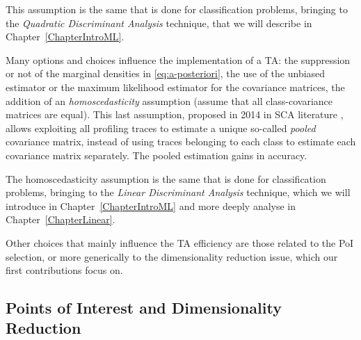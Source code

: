\begin{remark}This assumption is the same that is done for classification problems, bringing to the \emph{Quadratic Discriminant Analysis} technique, that we will describe in Chapter~\ref{ChapterIntroML}. 
\end{remark}

Many options and choices influence the implementation of a TA: the suppression or not of the marginal densities in \eqref{eq:a-posteriori}, the use of the unbiased estimator or the maximum likelihood estimator for the covariance matrices, the addition of an \emph{homoscedasticity} assumption (assume that all class-covariance matrices are equal). This last assumption, proposed in 2014 in SCA literature \cite{choudary2014efficient},  allows exploiting all profiling traces to estimate a unique so-called \emph{pooled} covariance matrix, instead of using traces belonging to each class to estimate each covariance matrix separately. The pooled estimation gains in accuracy. 

\begin{remark}
The homoscedasticity assumption is the same that is done for classification problems, bringing to the \emph{Linear Discriminant Analysis} technique, which we will introduce in Chapter~\ref{ChapterIntroML} and more deeply analyse in Chapter~\ref{ChapterLinear}.  
\end{remark}

Other choices that mainly influence the TA efficiency are those related to the PoI selection, or more generically to the dimensionality reduction issue, which our first contributions focus on.

\subsection{Points of Interest and Dimensionality Reduction}\label{sec:extractors}


